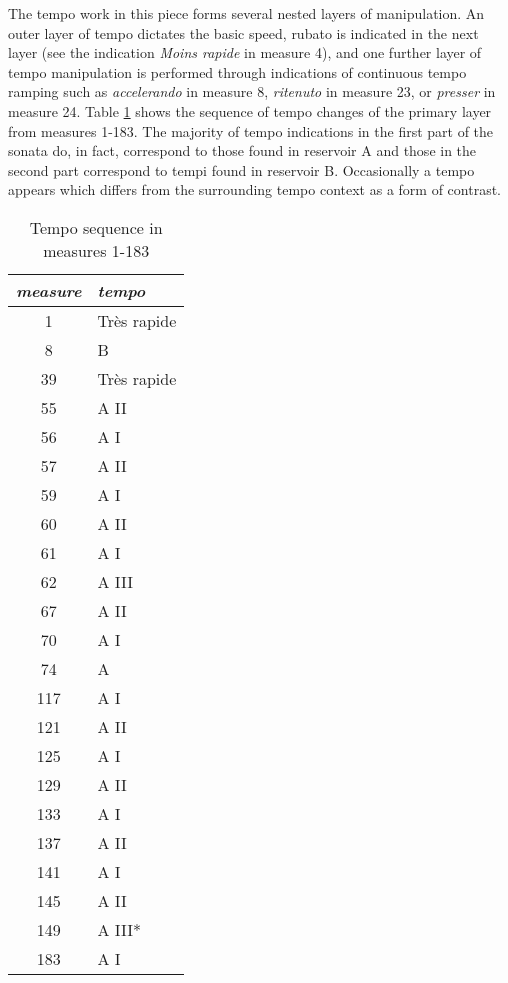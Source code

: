 The tempo work in this piece forms several nested layers of manipulation. An outer layer of tempo dictates the basic speed, rubato is indicated in the next layer (see the indication \textit{Moins rapide} in measure 4), and one further layer of tempo manipulation is performed through indications of continuous tempo ramping such as \textit{accelerando} in measure 8, \textit{ritenuto} in measure 23, or \textit{presser} in measure 24. Table \ref{tab:first-tempo-sequence} shows the sequence of tempo changes of the primary layer from measures 1-183. The majority of tempo indications in the first part of the sonata do, in fact, correspond to those found in reservoir A and those in the second part correspond to tempi found in reservoir B. Occasionally a tempo appears which differs from the surrounding tempo context as a form of contrast.

\begin{table}[p]
    \centering
    \begin{tabular}{c | l}
        \textit{measure} & \textit{tempo} \\
        \hline
        1 & Très rapide \\
        8 & B \\
        39 & Très rapide \\
        55 & A II \\
        56 & A I \\
        57 & A II \\
        59 & A I \\
        60 & A II \\
        61 & A I \\
        62 & A III \\
        67 & A II \\
        70 & A I \\
        74 & A \\
        117 & A I \\
        121 & A II \\
        125 & A I \\
        129 & A II \\
        133 & A I \\
        137 & A II \\
        141 & A I \\
        145 & A II \\
        149 & A III* \\
        183 & A I \\
        
    \end{tabular}
    \caption{Tempo sequence in measures 1-183}
    \label{tab:first-tempo-sequence}
\end{table}


